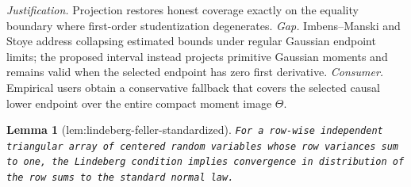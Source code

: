 \documentclass{article}
\newtheorem{lemma}{Lemma}
\begin{document}
\par\smallskip\noindent \textit{Justification.} Projection restores honest coverage exactly on the equality boundary where first-order studentization degenerates. \textit{Gap.} Imbens--Manski and Stoye address collapsing estimated bounds under regular Gaussian endpoint limits; the proposed interval instead projects primitive Gaussian moments and remains valid when the selected endpoint has zero first derivative. \textit{Consumer.} Empirical users obtain a conservative fallback that covers the selected causal lower endpoint over the entire compact moment image \(\Theta\).

\begin{lemma}[lem:lindeberg-feller-standardized]\label{lem:lindeberg-feller-standardized}
\texttt{For a row-\allowbreak{}wise independent triangular array of centered random variables whose row variances sum to one,\allowbreak{} the Lindeberg condition implies convergence in distribution of the row sums to the standard normal law.}
\end{lemma}
\end{document}
